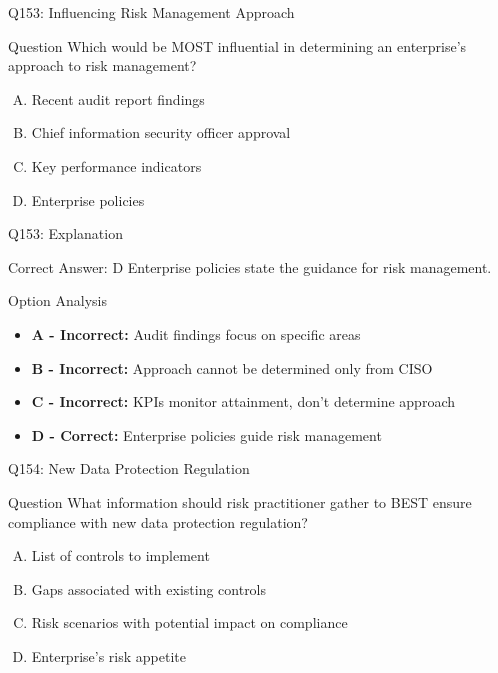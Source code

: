 \documentclass{beamer}
\begin{document}
	\begin{frame}{Q153: Influencing Risk Management Approach}
		\begin{block}{Question}
			Which would be MOST influential in determining an enterprise's approach to risk management?
		\end{block}
		\begin{enumerate}[(A)]
			\item Recent audit report findings
			\item Chief information security officer approval
			\item Key performance indicators
			\item Enterprise policies
		\end{enumerate}
	\end{frame}
	
	\begin{frame}{Q153: Explanation}
		\begin{block}{Correct Answer: D}
			Enterprise policies state the guidance for risk management.
		\end{block}
		\begin{block}{Option Analysis}
			\begin{itemize}
				\item \textbf{A - Incorrect:} Audit findings focus on specific areas
				\item \textbf{B - Incorrect:} Approach cannot be determined only from CISO
				\item \textbf{C - Incorrect:} KPIs monitor attainment, don't determine approach
				\item \textbf{D - Correct:} Enterprise policies guide risk management
			\end{itemize}
		\end{block}
	\end{frame}
	
	\begin{frame}{Q154: New Data Protection Regulation}
		\begin{block}{Question}
			What information should risk practitioner gather to BEST ensure compliance with new data protection regulation?
		\end{block}
		\begin{enumerate}[(A)]
			\item List of controls to implement
			\item Gaps associated with existing controls
			\item Risk scenarios with potential impact on compliance
			\item Enterprise's risk appetite
		\end{enumerate}
	\end{frame}
	
\end{document}
